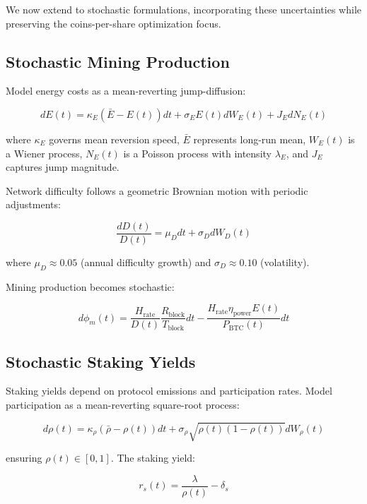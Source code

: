 \documentclass[
  journal=medium,
  manuscript=article-type,
  year=2025,
  volume=1,
]{cup-journal}
\theoremstyle{definition}
\begin{document}
We now extend to stochastic formulations, incorporating these uncertainties while preserving the coins-per-share optimization focus.

\subsection{Stochastic Mining Production}

Model energy costs as a mean-reverting jump-diffusion:

\begin{equation}
dE(t) = \kappa_E (\bar{E} - E(t)) dt + \sigma_E E(t) dW_E(t) + J_E dN_E(t)
\end{equation}

where $\kappa_E$ governs mean reversion speed, $\bar{E}$ represents long-run mean, $W_E(t)$ is a Wiener process, $N_E(t)$ is a Poisson process with intensity $\lambda_E$, and $J_E$ captures jump magnitude.

Network difficulty follows a geometric Brownian motion with periodic adjustments:

\begin{equation}
\frac{dD(t)}{D(t)} = \mu_D dt + \sigma_D dW_D(t)
\end{equation}

where $\mu_D \approx 0.05$ (annual difficulty growth) and $\sigma_D \approx 0.10$ (volatility).

Mining production becomes stochastic:

\begin{equation}
d\phi_m(t) = \frac{H_{\text{rate}}}{D(t)} \frac{R_{\text{block}}}{T_{\text{block}}} dt - \frac{H_{\text{rate}} \eta_{\text{power}} E(t)}{P_{\text{BTC}}(t)} dt
\end{equation}

\subsection{Stochastic Staking Yields}

Staking yields depend on protocol emissions and participation rates. Model participation as a mean-reverting square-root process:

\begin{equation}
d\rho(t) = \kappa_\rho (\bar{\rho} - \rho(t)) dt + \sigma_\rho \sqrt{\rho(t)(1 - \rho(t))} dW_\rho(t)
\end{equation}

ensuring $\rho(t) \in [0, 1]$. The staking yield:

\begin{equation}
r_s(t) = \frac{\lambda}{\rho(t)} - \delta_s
\end{equation}
\end{document}
